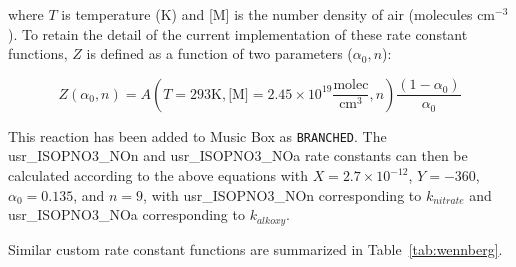 \documentclass[titlepage]{article}
\begin{document}
\noindent where $T$ is temperature (K) and [M] is the number density of air (molecules $\mbox{cm}^{-3}$).
To retain the detail of the current implementation of these rate constant functions, $Z$ is defined as a function of two parameters ($\alpha_0, n$):

\begin{equation}
Z( \alpha_0, n) = A(T = 293 \mbox{K}, \mbox{[M]} = 2.45 \times 10^{19} \frac{\mbox{molec}}{\mbox{cm}^3}, n) \frac{(1-\alpha_0)}{\alpha_0}
\end{equation}

This reaction has been added to Music Box as \verb>BRANCHED>. The usr\_ISOPNO3\_NOn and usr\_ISOPNO3\_NOa rate constants can then be calculated according to the above equations with $X = 2.7 \times 10^{-12}$, $Y = -360$, $\alpha_0 = 0.135$, and $n = 9$, with usr\_ISOPNO3\_NOn corresponding to $k_{nitrate}$ and usr\_ISOPNO3\_NOa corresponding to $k_{alkoxy}$.

Similar custom rate constant functions are summarized in Table~\ref{tab:wennberg}.
\end{document}
